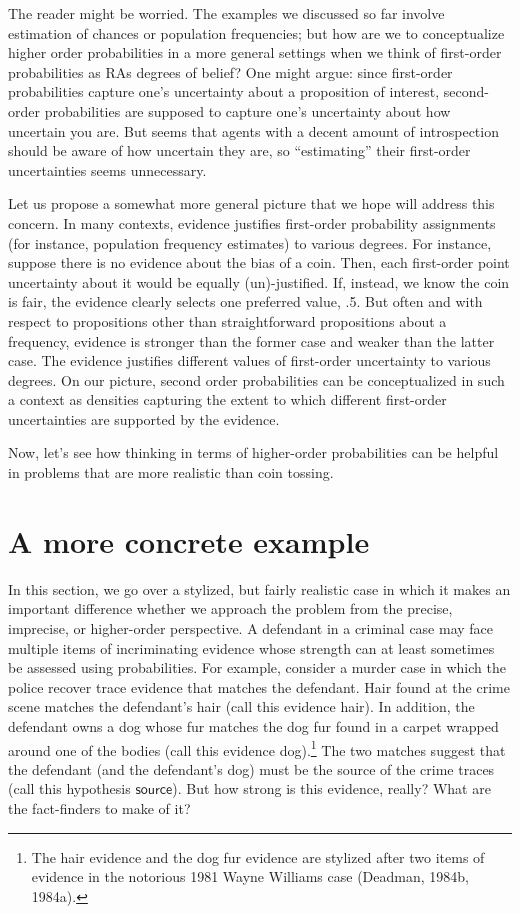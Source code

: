 \documentclass[
  10pt,
  dvipsnames,enabledeprecatedfontcommands]{scrartcl}
\begin{document}

The reader might be worried. The examples we discussed so far involve
estimation of chances or population frequencies; but how are we to
conceptualize higher order probabilities in a more general settings when
we think of first-order probabilities as RAs degrees of belief? One
might argue: since first-order probabilities capture one's uncertainty
about a proposition of interest, second-order probabilities are supposed
to capture one's uncertainty about how uncertain you are. But seems that
agents with a decent amount of introspection should be aware of how
uncertain they are, so ``estimating'' their first-order uncertainties
seems unnecessary.

Let us propose a somewhat more general picture that we hope will address
this concern. In many contexts, evidence justifies first-order
probability assignments (for instance, population frequency estimates)
to various degrees. For instance, suppose there is no evidence about the
bias of a coin. Then, each first-order point uncertainty about it would
be equally (un)-justified. If, instead, we know the coin is fair, the
evidence clearly selects one preferred value, .5. But often and with
respect to propositions other than straightforward propositions about a
frequency, evidence is stronger than the former case and weaker than the
latter case. The evidence justifies different values of first-order
uncertainty to various degrees. On our picture, second order
probabilities can be conceptualized in such a context as densities
capturing the extent to which different first-order uncertainties are
supported by the evidence.

Now, let's see how thinking in terms of higher-order probabilities can
be helpful in problems that are more realistic than coin tossing.

\section{A more concrete example}\label{a-more-concrete-example}

In this section, we go over a stylized, but fairly realistic case in
which it makes an important difference whether we approach the problem
from the precise, imprecise, or higher-order perspective. A defendant in
a criminal case may face multiple items of incriminating evidence whose
strength can at least sometimes be assessed using probabilities. For
example, consider a murder case in which the police recover trace
evidence that matches the defendant. Hair found at the crime scene
matches the defendant's hair (call this evidence \textsf{hair}). In
addition, the defendant owns a dog whose fur matches the dog fur found
in a carpet wrapped around one of the bodies (call this evidence
\textsf{dog}).\footnote{The hair evidence and the dog fur evidence are
  stylized after two items of evidence in the notorious 1981 Wayne
  Williams case (Deadman, 1984b, 1984a).} The two matches suggest that
the defendant (and the defendant's dog) must be the source of the crime
traces (call this hypothesis \(\mathsf{source}\)). But how strong is
this evidence, really? What are the fact-finders to make of it?
\end{document}
